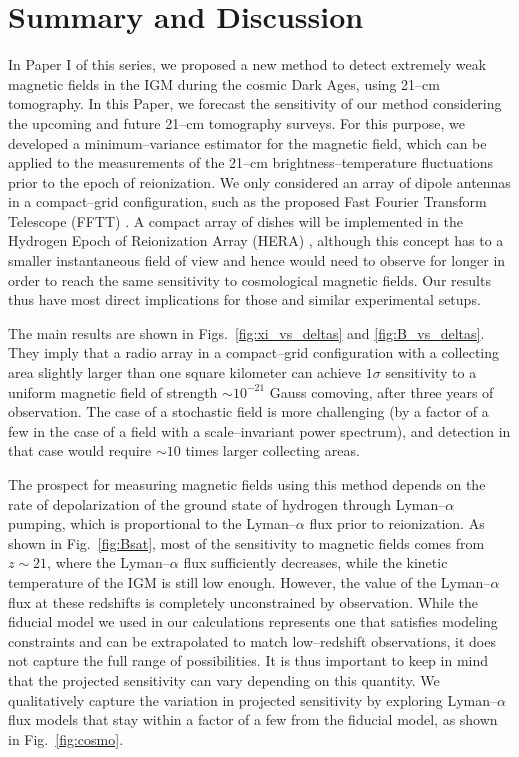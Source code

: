 \section{Summary and Discussion}
\label{sec:conclusions}

In Paper I of this series, we proposed a new method to detect extremely weak magnetic fields in the IGM during the cosmic Dark Ages, using 21--cm tomography. In this Paper, we forecast the sensitivity of our method considering the upcoming and future 21--cm tomography surveys. For this purpose, we developed a minimum--variance estimator for the magnetic field, which can be applied to the measurements of the 21--cm brightness--temperature fluctuations prior to the epoch of reionization. We only considered an array of dipole antennas in a compact--grid configuration, such as the proposed Fast Fourier Transform Telescope (FFTT) \cite{2009PhRvD..79h3530T}. A compact array of dishes will be implemented in the Hydrogen Epoch of Reionization Array (HERA) \cite{2015AAS...22532803D}, although this concept has to a smaller instantaneous field of view and hence would need to observe for longer in order to reach the same sensitivity to cosmological magnetic fields. Our results thus have most direct implications for those and similar experimental setups.

The main results are shown in Figs.~\ref{fig:xi_vs_deltas} and \ref{fig:B_vs_deltas}. They imply that a radio array in a compact--grid configuration with a collecting area slightly larger than one square kilometer can achieve $1\sigma$ sensitivity to a uniform magnetic field of strength $\sim10^{-21}$ Gauss comoving, after three years of observation. The case of a stochastic field is more challenging (by a factor of a few in the case of a field with a scale--invariant power spectrum), and detection in that case would require $\sim 10$ times larger collecting areas.

The prospect for measuring magnetic fields using this method depends on the rate of depolarization of the ground state of hydrogen through Lyman--$\alpha$ pumping, which is proportional to the Lyman--$\alpha$ flux prior to reionization. As shown in Fig.~\ref{fig:Bsat}, most of the sensitivity to magnetic fields comes from $z\sim 21$, where the Lyman--$\alpha$ flux sufficiently decreases, while the kinetic temperature of the IGM is still low enough. However, the value of the Lyman--$\alpha$ flux at these redshifts is completely unconstrained by observation. While the fiducial model we used in our calculations represents one that satisfies modeling constraints and can be extrapolated to match low--redshift observations, it does not capture the full range of possibilities. It is thus important to keep in mind that the projected sensitivity can vary depending on this quantity. We qualitatively capture the variation in projected sensitivity by exploring Lyman--$\alpha$ flux models that stay within a factor of a few from the fiducial model, as shown in Fig.~\ref{fig:cosmo}.

